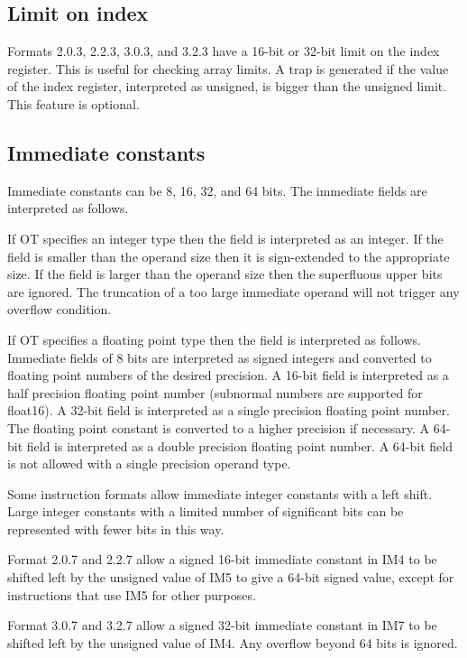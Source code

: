\documentclass[forwardcom.tex]{subfiles}
\begin{document}
\subsection{Limit on index}
Formats 2.0.3, 2.2.3, 3.0.3, and 3.2.3 have a 16-bit or 32-bit limit on the index register. This is useful for checking array limits. A trap is generated if the value of the index register, interpreted as unsigned, is bigger than the unsigned limit. This feature is optional.
\vv 

\subsection{Immediate constants}
Immediate constants can be 8, 16, 32, and 64 bits. The immediate fields are interpreted as follows.
\vv

If OT specifies an integer type then the field is interpreted as an integer. If the field is smaller than the operand size then it is sign-extended to the appropriate size. If the field is larger than the operand size then the superfluous upper bits are ignored. The truncation of a too large immediate operand will not trigger any overflow condition.
\vv

If OT specifies a floating point type then the field is interpreted as follows. Immediate fields of 8 bits are interpreted as signed integers and converted to floating point numbers of the desired precision. A 16-bit field is interpreted as a half precision floating point number (subnormal numbers are supported for float16). 
A 32-bit field is interpreted as a single precision floating point number. The floating point constant is converted to a higher precision if necessary. A 64-bit field is interpreted as a double precision floating point number. A 64-bit field is not allowed with a single precision operand type.
\vv

Some instruction formats allow immediate integer constants with a left shift. Large integer constants with a limited number of significant bits can be represented with fewer bits in this way.
\vv

Format 2.0.7 and 2.2.7 allow a signed 16-bit immediate constant in IM4 to be shifted left by the unsigned value of IM5 to give a 64-bit signed value, except for instructions that use IM5 for other purposes.
\vv

Format 3.0.7 and 3.2.7 allow a signed 32-bit immediate constant in IM7 to be shifted left by the unsigned value of IM4. 
Any overflow beyond 64 bits is ignored.
\vv
\end{document}
